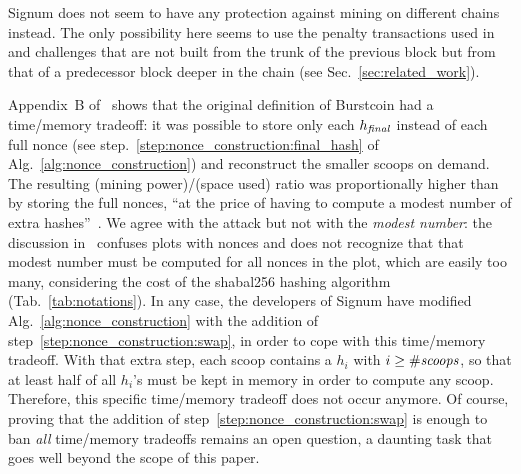 Signum does not seem to have any protection against mining on different chains instead.
The only possibility here seems to use the penalty transactions used in~\cite{ParkKFGAP18}
and challenges that
are not built from the trunk of the previous block but from that of a predecessor block deeper in the chain
(see Sec.~\ref{sec:related_work}).

Appendix~B of~\cite{ParkKFGAP18} shows that the
original definition of Burstcoin had a time/memory tradeoff:
it was possible to store only each ${h_{\mathit{final}}}$ instead of each full nonce
(see step.~\ref{step:nonce_construction:final_hash} of Alg.~\ref{alg:nonce_construction}) and
reconstruct the smaller scoops on demand. The resulting (mining power)/(space used) ratio was proportionally higher
than by storing the full nonces,
``at the price of having to compute a modest number of extra hashes''~\cite{ParkKFGAP18}.
We agree with the attack but not with the \emph{modest number}: the discussion in~\cite{ParkKFGAP18}
confuses plots with nonces and does not recognize that that modest number
must be computed for all nonces in the plot, which are easily too many, considering the
cost of the shabal256 hashing algorithm (Tab.~\ref{tab:notations}). In any case, the developers
of Signum have modified Alg.~\ref{alg:nonce_construction} with the addition of
step~\ref{step:nonce_construction:swap}, in order to cope with this time/memory tradeoff.
With that extra step, each scoop contains a $h_i$ with $i\ge{\#\mathit{scoops}}$, so that
at least half of all $h_i$'s must be kept in memory in order to compute any scoop.
Therefore, this specific time/memory tradeoff does not occur anymore. Of course, proving
that the addition of step~\ref{step:nonce_construction:swap} is enough to ban \emph{all}
time/memory tradeoffs remains an open question,
a daunting task that goes well beyond the scope of this paper.

